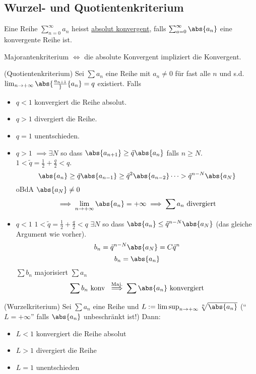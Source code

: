 \subsection{Wurzel- und Quotientenkriterium}
\begin{Def}
  Eine Reihe $\sum^\infty_{n=0} a_n$ heisst \ul{absolut konvergent}, falls $\sum_{a=0}^\infty \abs{a_n}$ eine konvergente Reihe ist.
\end{Def}
\begin{Bem}
  Majorantenkriterium $\iff$ die absolute Konvergent impliziert die Konvergent.
\end{Bem}
\begin{Sat} (Quotientenkriterium)
  Sei $\sum a_n$ eine Reihe mit $a_n\neq 0$ für fast alle $n$ und s.d. $\lim_{n\to+\infty}\abs{\frac{a_{n+1}}}{a_n}=q$ existiert. Falls
  \begin{itemize}
    \item $q<1$ konvergiert die Reihe absolut.
    \item $q>1$ divergiert die Reihe.
    \item $q=1$ unentschieden.
  \end{itemize}
\end{Sat}
\begin{Bew}
  \begin{itemize}
    \item $q>1$ $\implies \exists N$ so dass $\abs{a_{n+1}}\geq \tilde q\abs{a_n}$ falls $n\geq N$. $1<\tilde q=\frac{1}{2}+\frac{q}{2}<q$.
      \[\abs{a_n}\geq \tilde q\abs{a_{n-1}}\geq \tilde{q}^2\abs{a_{n-2}}\cdots>\tilde{q}^{n-N}\abs{a_N}\]
      oBdA $\abs{a_N}\neq 0$
      \[\implies \lim_{n\to+\infty}\abs{a_n}=+\infty\implies\sum a_n\text{ divergiert}\]
    \item $q<1$ $1<\tilde q=\frac{1}{2}+\frac{q}{2}<q$ $\exists N$ so dass $\abs{a_n}\leq \tilde{q}^{n-N}\abs{a_N}$ (das gleiche Argument wie vorher).
      \[b_n=\tilde{q}^{n-N}\abs{a_N}=C\tilde{q}^n\]
      \[b_n=\abs{a_n}\]
      $\sum b_n$ majorisiert $\sum a_n$
      \[\sum b_n \text{ konv }\stackrel{\text{Maj.}}{\implies}\sum\abs{a_n} \text{ konvergiert}\]
  \end{itemize}
\end{Bew}
\begin{Sat} (Wurzelkriterium)
  Sei $\sum a_n$ eine Reihe und $L:=\limsup_{n\to+\infty}\sqrt[n]{\abs{a_n}}$ (``$L=+\infty$'' falls $\abs{a_n}$ unbeschränkt ist!) Dann:
  \begin{itemize}
    \item $L<1$ konvergiert die Reihe absolut
    \item $L>1$ divergiert die Reihe
    \item $L=1$ unentschieden
  \end{itemize}
\end{Sat}
